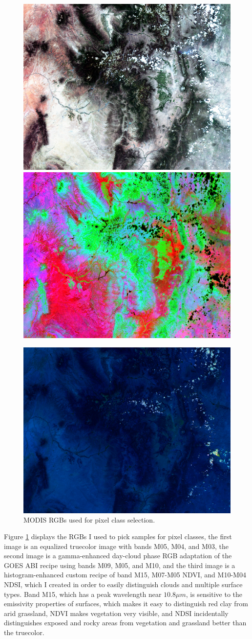 \documentclass[12pt]{article}
\begin{document}
\begin{figure}[h!]
    \centering
    \includegraphics[width=.48\linewidth]{figures/p3/selectionRGB_M05-M04-M03_tcEQ.png}
    \includegraphics[width=.48\linewidth]{figures/p3/selectionRGB_M15-NDVI-NDSI_custom.png}

    \vspace{.2em}
    \includegraphics[width=.48\linewidth]{figures/p3/selectionRGB_M09-M05-M10_dcp.png}
    \caption{MODIS RGBs used for pixel class selection.}
    \label{p3_selection_rgbs}
\end{figure}

Figure \ref{p3_selection_rgbs} displays the RGBs I used to pick samples for pixel classes, the first image is an equalized truecolor image with bands M05, M04, and M03, the second image is a gamma-enhanced day-cloud phase RGB adaptation of the GOES ABI recipe using bands M09, M05, and M10, and the third image is a histogram-enhanced custom recipe of band M15, M07-M05 NDVI, and M10-M04 NDSI, which I created in order to easily distinguish clouds and multiple surface types. Band M15, which has a peak wavelength near $10.8\mu m$, is sensitive to the emissivity properties of surfaces, which makes it easy to distinguish red clay from arid grassland, NDVI makes vegetation very visible, and NDSI incidentally distinguishes exposed and rocky areas from vegetation and grassland better than the truecolor.
\end{document}
